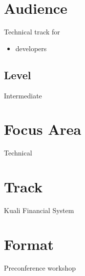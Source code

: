 \documentclass[12pt,notitlepage]{article}
\begin{document}
\section{Audience}
Technical track for
\begin{itemize}
\item developers
\end{itemize}


\subsection{Level}
Intermediate

\section{Focus Area}
Technical

\section{Track}
Kuali Financial System

\section{Format}
Preconference workshop
\end{document}
